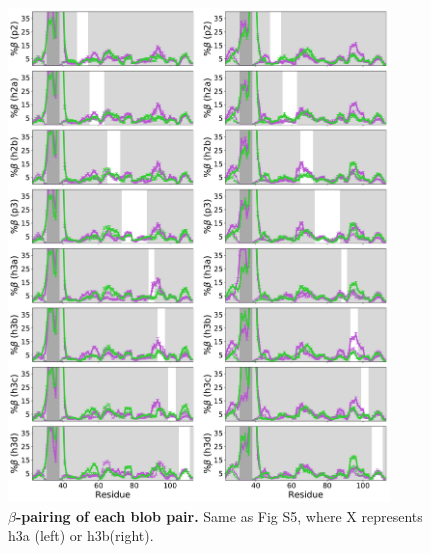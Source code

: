 \documentclass[10pt,letterpaper]{article}
\begin{document}
\begin{figure}[!ht]
\includegraphics[scale=0.5,width=0.9\textwidth,trim={0 0cm 0 0cm},clip]{./figures/S8.pdf}
\caption{{\bf $\beta$-pairing of each blob pair.} Same as Fig S5, where X represents h3a (left) or h3b(right).} 
\label{S7} 
\end{figure}
\end{document}
